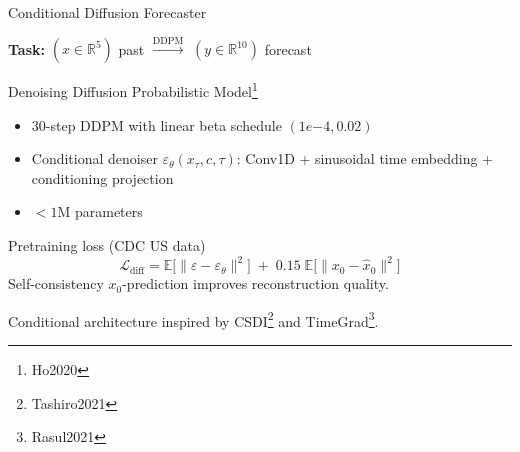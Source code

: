 \documentclass[10pt]{beamer}
\newcommand{\papercite}[1]{\footnote{\tiny #1}}
\begin{document}
\begin{frame}{Conditional Diffusion Forecaster}

  \textbf{Task:} $(x \in \mathbb{R}^{5})$ past \hspace{0.5cm}
  $\xrightarrow{\text{DDPM}}$ \hspace{0.5cm}
  $(y \in \mathbb{R}^{10})$ forecast

  \vspace{0.3cm}
  \begin{block}{Denoising Diffusion Probabilistic Model\papercite{Ho2020}}
    \begin{itemize}
      \item 30-step DDPM with linear beta schedule $(1e{-4}, 0.02)$
      \item Conditional denoiser $\varepsilon_\theta(x_\tau, c, \tau)$:
            Conv1D + sinusoidal time embedding + conditioning projection
      \item $< 1$M parameters
    \end{itemize}
  \end{block}

  \begin{block}{Pretraining loss (CDC US data)}
    \[
      \mathcal{L}_{\text{diff}} = \mathbb{E}\big[\|\varepsilon - \varepsilon_\theta\|^2\big]
      \;+\; 0.15\;\mathbb{E}\big[\|x_0 - \hat{x}_0\|^2\big]
    \]
    Self-consistency $x_0$-prediction improves reconstruction quality.
  \end{block}

  Conditional architecture inspired by CSDI\papercite{Tashiro2021} and
  TimeGrad\papercite{Rasul2021}.

\end{frame}
\end{document}
